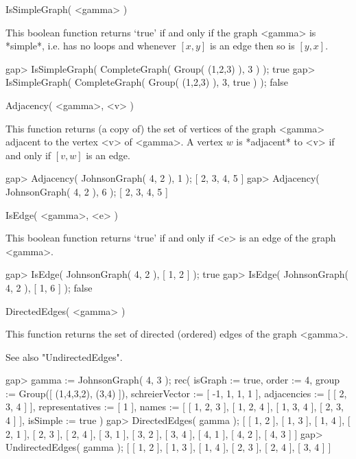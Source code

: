 \>IsSimpleGraph( <gamma> )

This boolean function returns `true' if and only if the graph <gamma>
is *simple*, i.e. has no loops and whenever $[x,y]$ is an edge then so
is $[y,x]$.

\beginexample
gap> IsSimpleGraph( CompleteGraph( Group( (1,2,3) ), 3 ) );
true
gap> IsSimpleGraph( CompleteGraph( Group( (1,2,3) ), 3, true ) );
false 
\endexample


\>Adjacency( <gamma>, <v> )

This function returns (a copy of) the set of vertices of the graph
<gamma> adjacent to the vertex <v> of <gamma>.  A vertex $w$ is
*adjacent* to <v> if and only if $[v,w]$ is an edge.

\beginexample
gap> Adjacency( JohnsonGraph( 4, 2 ), 1 );
[ 2, 3, 4, 5 ]
gap> Adjacency( JohnsonGraph( 4, 2 ), 6 );
[ 2, 3, 4, 5 ] 
\endexample


\>IsEdge( <gamma>, <e> )

This  boolean function returns `true' if and  only  if <e> is an  edge of
the graph <gamma>.

\beginexample
gap> IsEdge( JohnsonGraph( 4, 2 ), [ 1, 2 ] );
true
gap> IsEdge( JohnsonGraph( 4, 2 ), [ 1, 6 ] );
false 
\endexample


\>DirectedEdges( <gamma> )

This function  returns the  set of directed  (ordered) edges of the graph
<gamma>.

See also "UndirectedEdges".

\beginexample
gap> gamma := JohnsonGraph( 4, 3 );
rec( isGraph := true, order := 4, group := Group([ (1,4,3,2), (3,4) ]), 
  schreierVector := [ -1, 1, 1, 1 ], adjacencies := [ [ 2, 3, 4 ] ], 
  representatives := [ 1 ], 
  names := [ [ 1, 2, 3 ], [ 1, 2, 4 ], [ 1, 3, 4 ], [ 2, 3, 4 ] ], 
  isSimple := true )
gap> DirectedEdges( gamma );
[ [ 1, 2 ], [ 1, 3 ], [ 1, 4 ], [ 2, 1 ], [ 2, 3 ], [ 2, 4 ], [ 3, 1 ], 
  [ 3, 2 ], [ 3, 4 ], [ 4, 1 ], [ 4, 2 ], [ 4, 3 ] ]
gap> UndirectedEdges( gamma );
[ [ 1, 2 ], [ 1, 3 ], [ 1, 4 ], [ 2, 3 ], [ 2, 4 ], [ 3, 4 ] ]
\endexample



